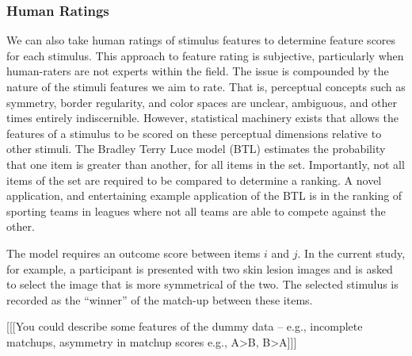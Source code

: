 \documentclass[a4paper, natbib, doc, 12pt]{apa7}
\begin{document}
\subsubsection{Human Ratings}
We can also take human ratings of stimulus features to determine feature scores for each stimulus. This approach to feature rating is subjective, particularly when human-raters are not experts within the field. The issue is compounded by the nature of the stimuli features we aim to rate. That is, perceptual concepts such as symmetry, border regularity, and color spaces are unclear, ambiguous, and other times entirely indiscernible. However, statistical machinery exists that allows the features of a stimulus to be scored on these perceptual dimensions relative to other stimuli. The Bradley Terry Luce model (BTL) estimates the probability that one item is greater than another, for all items in the set. Importantly, not all items of the set are required to be compared to determine a ranking. A novel application, and entertaining example application of the BTL is in the ranking of sporting teams in leagues where not all teams are able to compete against the other. 

The model requires an outcome score between items $i$ and $j$. In the current study, for example, a participant is presented with two skin lesion images and is asked to select the image that is more symmetrical of the two. The selected stimulus is recorded as the ``winner'' of the match-up between these items. 


[[[You could describe some features of the dummy data -- e.g., incomplete matchups, asymmetry in matchup scores e.g., A>B, B>A]]]
\end{document}
